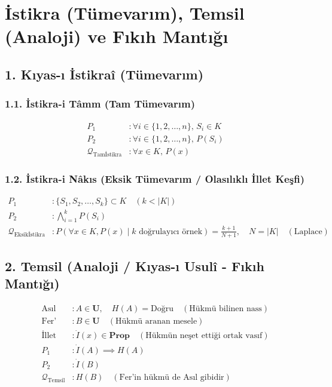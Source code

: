 \documentclass[11pt, a4paper]{article}
\begin{document}
\section{İstikra (Tümevarım), Temsil (Analoji) ve Fıkıh Mantığı}

\subsection{1. Kıyas-ı İstikraî (Tümevarım)}

\subsubsection{1.1. İstikra-i Tâmm (Tam Tümevarım)}
\begin{align}
P_1 &: \forall i \in \{1, 2, \dots, n\}, \, S_i \in K \\
P_2 &: \forall i \in \{1, 2, \dots, n\}, \, P(S_i) \\
\mathcal{Q}_{\text{Tamİstikra}} &: \forall x \in K, \, P(x)
\end{align}

\subsubsection{1.2. İstikra-i Nâkıs (Eksik Tümevarım / Olasılıklı İllet Keşfi)}
\begin{align}
P_1 &: \{S_1, S_2, \dots, S_k\} \subset K \quad (k < |K|) \\
P_2 &: \bigwedge_{i=1}^k P(S_i) \\
\mathcal{Q}_{\text{Eksikİstikra}} &: P\left( \forall x \in K, P(x) \mid k \text{ doğrulayıcı örnek} \right) = \frac{k+1}{N+1}, \quad N = |K| \quad (\text{Laplace})
\end{align}

\subsection{2. Temsil (Analoji / Kıyas-ı Usulî - Fıkıh Mantığı)}
\begin{align}
\text{Asıl} &: A \in \mathbf{U}, \quad H(A) = \text{Doğru} \quad (\text{Hükmü bilinen nass}) \\
\text{Fer'} &: B \in \mathbf{U} \quad (\text{Hükmü aranan mesele}) \\
\text{İllet} &: \dot{I}(x) \in \mathbf{Prop} \quad (\text{Hükmün neşet ettiği ortak vasıf}) \\
P_1 &: \dot{I}(A) \implies H(A) \\
P_2 &: \dot{I}(B) \\
\mathcal{Q}_{\text{Temsil}} &: H(B) \quad (\text{Fer'in hükmü de Asıl gibidir})
\end{align}
\end{document}
